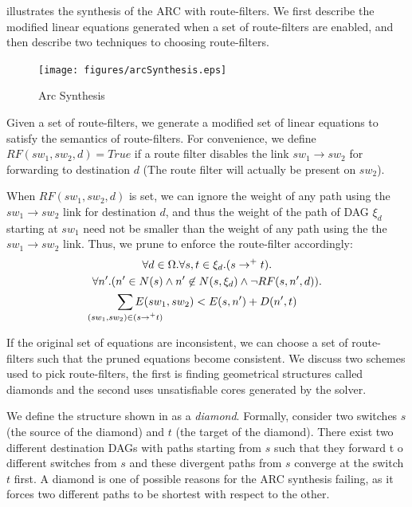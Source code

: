  illustrates the synthesis of 
the ARC with route-filters. We first describe the 
modified linear equations generated when a set of
route-filters are enabled, and then describe two
techniques to choosing route-filters. 
\begin{figure}
	\centering
	\texttt{[image: figures/arcSynthesis.eps]}
	\caption{Arc Synthesis} \label{fig:arcSynthesis}
\end{figure}

Given a set of route-filters, we generate a modified 
set of linear equations to satisfy the 
semantics of route-filters.
For convenience, we define $RF(sw_1, sw_2, d) = True$ 
if a route filter disables the link $sw_1 \rightarrow sw_2$
for forwarding to destination $d$ (The route filter will
actually be present on $sw_2$). 

When $RF(sw_1, sw_2, d)$ is set, we can ignore the 
weight of any path using the $sw_1 \rightarrow sw_2$
link for destination $d$, and thus 
the weight of the path of DAG $\xi_d$
starting at $sw_1$ need not be smaller than the weight
of any path
using the the $sw_1 \rightarrow sw_2$ link. Thus,
we prune  to enforce the route-filter accordingly:
\begin{multline} \label{eq:uniq}
		\forall d \in \Omega. \forall s, t \in \xi_d. (s \rightarrow^+ t).\\ 
		\forall n'. (n' \in N(s) \wedge n' \not\in N(s, \xi_d) \wedge \neg RF(s,n',d)). \\
		\sum_{\mathclap{\substack{(sw_1, sw_2) \in (s \rightarrow^+ t)}}} 
		E(sw_1, sw_2) < E(s, n') + D(n', t)   
\end{multline}

If the original set of equations are inconsistent, we 
can choose a set of route-filters such that the pruned
equations become consistent. 
We discuss two schemes used to pick route-filters,
the first is finding geometrical structures called diamonds 
and the second uses unsatisfiable cores generated
by the solver.

We define the structure shown in 
as a \emph{diamond}. Formally,
consider two switches $s$ (the source of the diamond) 
and $t$ (the target of the diamond).
There exist two different destination DAGs with 
paths starting from $s$ such that they forward t
o different switches from $s$  
and these divergent paths from $s$ converge
at the switch $t$ first. A diamond is 
one of possible reasons for the ARC synthesis 
failing, as it forces two different paths to be 
shortest with respect to the other. 

